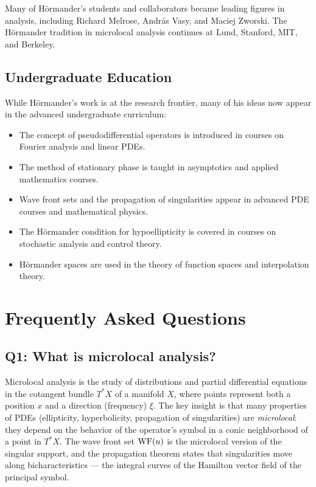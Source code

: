 Many of H\"ormander's students and collaborators became leading figures
in analysis, including Richard Melrose, Andr\'as Vasy, and Maciej
Zworski. The H\"ormander tradition in microlocal analysis continues at
Lund, Stanford, MIT, and Berkeley.

\subsection{Undergraduate Education}

While H\"ormander's work is at the research frontier, many of his ideas
now appear in the advanced undergraduate curriculum:
\begin{itemize}
    \item The concept of pseudodifferential operators is introduced in
    courses on Fourier analysis and linear PDEs.
    \item The method of stationary phase is taught in asymptotics and
    applied mathematics courses.
    \item Wave front sets and the propagation of singularities appear
    in advanced PDE courses and mathematical physics.
    \item The H\"ormander condition for hypoellipticity is covered in
    courses on stochastic analysis and control theory.
    \item H\"ormander spaces are used in the theory of function spaces
    and interpolation theory.
\end{itemize}

\section{Frequently Asked Questions}

\subsection*{Q1: What is microlocal analysis?}

Microlocal analysis is the study of distributions and partial
differential equations in the cotangent bundle \(T^*X\) of a manifold
\(X\), where points represent both a position \(x\) and a direction
(frequency) \(\xi\). The key insight is that many properties of PDEs
(ellipticity, hyperbolicity, propagation of singularities) are
\textit{microlocal}: they depend on the behavior of the operator's
symbol in a conic neighborhood of a point in \(T^*X\). The wave front
set \(\operatorname{WF}(u)\) is the microlocal version of the singular support, and
the propagation theorem states that singularities move along
bicharacteristics --- the integral curves of the Hamilton vector field
of the principal symbol.


